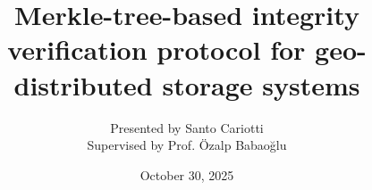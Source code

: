 \documentclass{beamer}
\title{Merkle-tree-based integrity verification protocol for geo-distributed storage
systems}
\author{Presented by Santo Cariotti\\Supervised by Prof. Özalp Babaoğlu}
\institute{Alma Mater Studiorum\\ Università di Bologna}
\date{October 30, 2025}
\begin{document}
\frame{\titlepage}








\end{document}
